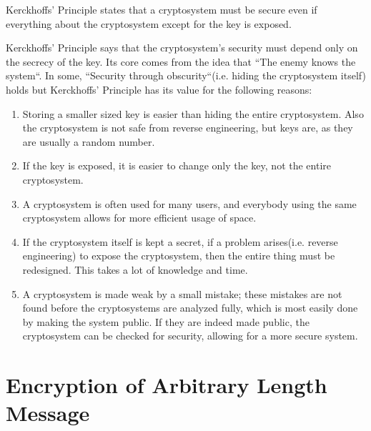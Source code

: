\documentclass{report}
\begin{document}
		\begin{defn}
			Kerckhoffs' Principle states that a cryptosystem must be secure even if everything about the cryptosystem except for the key is exposed.
		\end{defn}
		Kerckhoffs' Principle says that the cryptosystem's security must depend only on the secrecy of the key. Its core comes from the idea that ``The enemy knows the system``. In some, ``Security through obscurity``(i.e. hiding the cryptosystem itself) holds but Kerckhoffs' Principle has its value for the following reasons:
		\begin{enumerate}
			\item Storing a smaller sized key is easier than hiding the entire cryptosystem. Also the cryptosystem is not safe from reverse engineering, but keys are, as they are usually a random number.
			\item If the key is exposed, it is easier to change only the key, not the entire cryptosystem.
			\item A cryptosystem is often used for many users, and everybody using the same cryptosystem allows for more efficient usage of space.
			\item If the cryptosystem itself is kept a secret, if a problem arises(i.e. reverse engineering) to expose the cryptosystem, then the entire thing must be redesigned. This takes a lot of knowledge and time.
			\item A cryptosystem is made weak by a small mistake; these mistakes are not found before the cryptosystems are analyzed fully, which is most easily done by making the system public. If they are indeed made public, the cryptosystem can be checked for security, allowing for a more secure system.
		\end{enumerate}
		
	\section{Encryption of Arbitrary Length Message}
\end{document}
